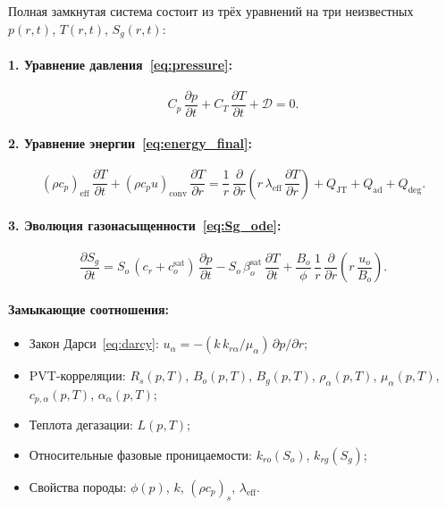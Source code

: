 \documentclass[12pt,a4paper]{article}
\begin{document}
Полная замкнутая система состоит из трёх уравнений на три неизвестных
$p(r,t)$, $T(r,t)$, $S_g(r,t)$:

\paragraph{1. Уравнение давления~\eqref{eq:pressure}:}
\[
  C_p\,\frac{\partial p}{\partial t}
  + C_T\,\frac{\partial T}{\partial t}
  + \mathcal{D} = 0.
\]

\paragraph{2. Уравнение энергии~\eqref{eq:energy_final}:}
\[
  (\rho c_p)_{\mathrm{eff}}\,\frac{\partial T}{\partial t}
  + (\rho c_p u)_{\mathrm{conv}}\,\frac{\partial T}{\partial r}
  = \frac{1}{r}\,\frac{\partial}{\partial r}\!\left(
      r\,\lambda_{\mathrm{eff}}\,\frac{\partial T}{\partial r}
    \right)
  + Q_{\mathrm{JT}} + Q_{\mathrm{ad}} + Q_{\mathrm{deg}}.
\]

\paragraph{3. Эволюция газонасыщенности~\eqref{eq:Sg_ode}:}
\[
  \frac{\partial S_g}{\partial t}
  = S_o\,(c_r + c_o^{\mathrm{sat}})\,\frac{\partial p}{\partial t}
    - S_o\,\beta_o^{\mathrm{sat}}\,\frac{\partial T}{\partial t}
    + \frac{B_o}{\phi}\,\frac{1}{r}\,\frac{\partial}{\partial r}\!
      \left(r\,\frac{u_o}{B_o}\right).
\]

\paragraph{Замыкающие соотношения:}
\begin{itemize}[nosep]
  \item Закон Дарси~\eqref{eq:darcy}: $u_\alpha = -(k\,k_{r\alpha}/\mu_\alpha)\,\partial p/\partial r$;
  \item PVT-корреляции: $R_s(p,T)$, $B_o(p,T)$, $B_g(p,T)$, $\rho_\alpha(p,T)$,
        $\mu_\alpha(p,T)$, $c_{p,\alpha}(p,T)$, $\alpha_\alpha(p,T)$;
  \item Теплота дегазации: $L(p,T)$;
  \item Относительные фазовые проницаемости: $k_{ro}(S_o)$, $k_{rg}(S_g)$;
  \item Свойства породы: $\phi(p)$, $k$, $(\rho c_p)_s$, $\lambda_{\mathrm{eff}}$.
\end{itemize}
\end{document}
